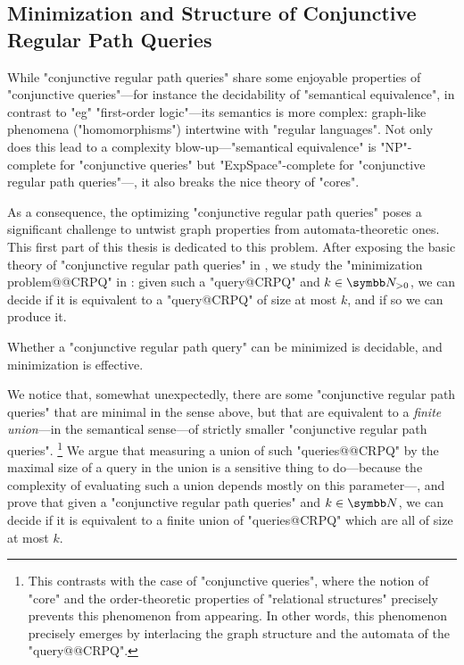 \subsection{Minimization and Structure of Conjunctive Regular Path Queries}

While "conjunctive regular path queries" share some enjoyable properties
of "conjunctive queries"---for instance the decidability of "semantical equivalence",
in contrast to "eg" "first-order logic"---its semantics is more complex:
graph-like phenomena ("homomorphisms") intertwine with "regular languages".
Not only does this lead to a complexity blow-up---"semantical equivalence" is "NP"-complete
for "conjunctive queries" but "ExpSpace"-complete for "conjunctive regular path queries"---,
it also breaks the nice theory of "cores".

As a consequence, the optimizing "conjunctive regular path queries" poses
a significant challenge to untwist graph properties from automata-theoretic ones.
This first part of this thesis is dedicated to this problem.
After exposing the basic theory of "conjunctive regular path queries"
in , we study
the "minimization problem@@CRPQ" in :
given such a "query@CRPQ" and $k\in\Np$, we can decide if it is equivalent to a "query@CRPQ"
of size at most $k$, and if so we can produce it.

\begin{contribution}
	Whether a "conjunctive regular path query" can be minimized is decidable,
	and minimization is effective.
\end{contribution}

We notice that, somewhat unexpectedly, there are some "conjunctive regular path queries"
that are minimal in the sense above, but that are equivalent to a \emph{finite union}---in the 
semantical sense---of strictly smaller "conjunctive regular path queries".%
\footnote{This contrasts with the case of "conjunctive queries",
where the notion of "core" and the order-theoretic properties
of "relational structures" precisely prevents this phenomenon from appearing.
In other words, this phenomenon precisely emerges by interlacing
the graph structure and the automata of the "query@@CRPQ".}
We argue that measuring a union of such "queries@@CRPQ" by the maximal size
of a query in the union is a sensitive thing to do---because the complexity
of evaluating such a union depends mostly on this parameter---, and prove
that given a "conjunctive regular path queries" and $k\in\N$, we can
decide if it is equivalent to a finite union of
"queries@CRPQ" which are all of size at most $k$.

